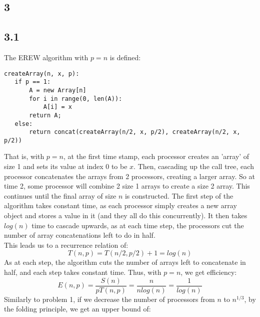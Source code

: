 \documentclass[letterpaper,notitlepage,twoside]{article}
\begin{document}
\subsection*{3}
\subsection*{3.1}
The EREW algorithm with $p=n$ is defined:
\begin{verbatim}
createArray(n, x, p):
   if p == 1:
       A = new Array[n]
       for i in range(0, len(A)):
           A[i] = x
       return A;
   else:
       return concat(createArray(n/2, x, p/2), createArray(n/2, x, p/2))
\end{verbatim}
That is, with $p=n$, at the first time stamp, each processor creates an 'array' of size 1 and sets its value at index 0 to be $x$. Then, cascading up the call tree, each processor concatenates the arrays from 2 processors, creating a larger array. So at time 2, some processor will combine 2 size 1 arrays to create a size 2 array. This continues until the final array of size $n$ is constructed. The first step of the algorithm takes constant time, as each processor simply creates a new array object and stores a value in it (and they all do this concurrently). It then takes $log(n)$ time to cascade upwards, as at each time step, the processors cut the number of array concatenations left to do in half. \\
This leads us to a recurrence relation of:
$$T(n, p) = T(n/2, p/2) + 1 = log(n)$$
As at each step, the algorithm cuts the number of arrays left to concatenate in half, and each step takes constant time. Thus, with $p=n$, we get efficiency:
$$ E(n, p) = \frac{S(n)}{pT(n, p)} = \frac{n}{nlog(n)} = \frac{1}{log(n)}$$ 
Similarly to problem 1, if we decrease the number of processors from $n$ to $n^{1/3}$, by the folding principle, we get an upper bound of: 
\end{document}
